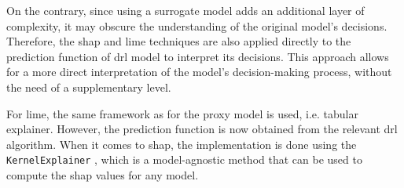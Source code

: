 On the contrary, since using a surrogate model adds an additional layer of complexity, it may obscure the understanding of the original model's decisions. Therefore, the \acrshort{shap} and \acrshort{lime} techniques are also applied directly to the prediction function of \acrshort{drl} model to interpret its decisions. This approach allows for a more direct interpretation of the model's decision-making process, without the need of a supplementary level. 

For \acrshort{lime}, the same framework as for the proxy model is used, i.e. tabular explainer. However, the prediction function is now obtained from the relevant \acrshort{drl} algorithm. When it comes to \acrshort{shap}, the implementation is done using the \texttt{KernelExplainer} \cite{ShapKernelExplainer}, which is a model-agnostic method that can be used to compute the \acrshort{shap} values for any model.
